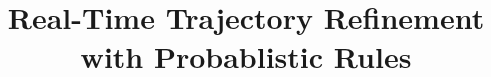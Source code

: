 \documentclass[10pt,numbers]{boilerplate/sigplanconf}
\begin{document}


\title{Real-Time Trajectory Refinement with Probablistic Rules}



\maketitle











\end{document}
